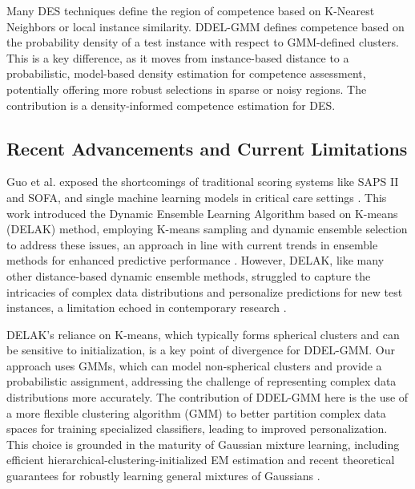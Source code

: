 \documentclass[lettersize,journal]{IEEEtran}
\newcommand{\greenhighlight}[1]{#1} %
\begin{document}
\greenhighlight{Many DES techniques define the region of competence based on K-Nearest Neighbors or local instance similarity. DDEL-GMM defines competence based on the probability density of a test instance with respect to GMM-defined clusters. This is a key difference, as it moves from instance-based distance to a probabilistic, model-based density estimation for competence assessment, potentially offering more robust selections in sparse or noisy regions. The contribution is a density-informed competence estimation for DES.}

\subsection{Recent Advancements and Current Limitations}
\noindent Guo et al. \cite{guo_dynamic_2021} exposed the shortcomings of traditional scoring systems like SAPS II and SOFA, and single machine learning models in critical care settings \cite{juraev_multilayer_2022, sagi_ensemble_2018}. This work introduced the Dynamic Ensemble Learning Algorithm based on K-means (DELAK) method, employing K-means sampling and dynamic ensemble selection to address these issues, an approach in line with current trends in ensemble methods for enhanced predictive performance \cite{dong_survey_2020, jiang_clustering-based_2019}. However, DELAK, like many other distance-based dynamic ensemble methods, struggled to capture the intricacies of complex data distributions and personalize predictions for new test instances, a limitation echoed in contemporary research \cite{mienye_survey_2022, gonzalez_practical_2020}. 

\greenhighlight{DELAK's reliance on K-means, which typically forms spherical clusters and can be sensitive to initialization, is a key point of divergence for DDEL-GMM. Our approach uses GMMs, which can model non-spherical clusters and provide a probabilistic assignment, addressing the challenge of representing complex data distributions more accurately. The contribution of DDEL-GMM here is the use of a more flexible clustering algorithm (GMM) to better partition complex data spaces for training specialized classifiers, leading to improved personalization. This choice is grounded in the maturity of Gaussian mixture learning, including efficient hierarchical-clustering-initialized EM estimation \cite{li_gaussian_2018} and recent theoretical guarantees for robustly learning general mixtures of Gaussians \cite{liu_robustly_2023}.}
\end{document}
